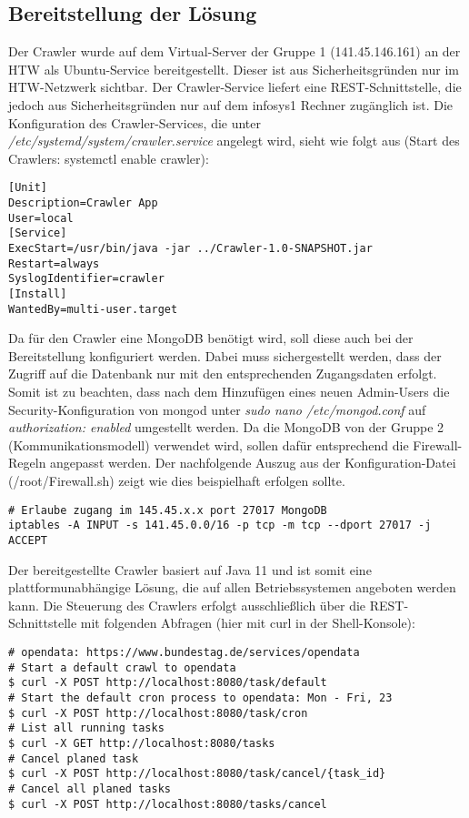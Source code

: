 \subsection{Bereitstellung der Lösung}
Der Crawler wurde auf dem Virtual-Server der Gruppe 1 (141.45.146.161) an der HTW als Ubuntu-Service bereitgestellt. Dieser ist aus Sicherheitsgründen nur im HTW-Netzwerk sichtbar. Der Crawler-Service liefert eine REST-Schnittstelle, die jedoch aus Sicherheitsgründen nur auf dem infosys1 Rechner zugänglich ist. Die Konfiguration des Crawler-Services, die unter \textit{/etc/systemd/system/crawler.service} angelegt wird, sieht wie folgt aus (Start des Crawlers: systemctl enable crawler):
\begin{lstlisting}
[Unit]
Description=Crawler App
User=local
[Service]
ExecStart=/usr/bin/java -jar ../Crawler-1.0-SNAPSHOT.jar
Restart=always
SyslogIdentifier=crawler
[Install]
WantedBy=multi-user.target
\end{lstlisting}
Da für den Crawler eine MongoDB benötigt wird, soll diese auch bei der Bereitstellung konfiguriert werden. Dabei muss sichergestellt werden, dass der Zugriff auf die Datenbank nur mit den entsprechenden Zugangsdaten erfolgt. Somit ist zu beachten, dass nach dem Hinzufügen eines neuen Admin-Users die Security-Konfiguration von mongod unter \textit{sudo nano /etc/mongod.conf} auf \textit{authorization: enabled} umgestellt werden. Da die MongoDB von der Gruppe 2 (Kommunikationsmodell) verwendet wird, sollen dafür entsprechend die Firewall-Regeln angepasst werden. Der nachfolgende Auszug aus der Konfiguration-Datei (/root/Firewall.sh) zeigt wie dies beispielhaft erfolgen sollte.
\begin{lstlisting}
# Erlaube zugang im 145.45.x.x port 27017 MongoDB
iptables -A INPUT -s 141.45.0.0/16 -p tcp -m tcp --dport 27017 -j ACCEPT
\end{lstlisting}
Der bereitgestellte Crawler basiert auf Java 11 und ist somit eine plattformunabhängige Lösung, die auf allen Betriebssystemen angeboten werden kann. Die Steuerung des Crawlers erfolgt ausschließlich über die REST-Schnittstelle mit folgenden Abfragen (hier mit curl in der Shell-Konsole):
\begin{lstlisting}
# opendata: https://www.bundestag.de/services/opendata
# Start a default crawl to opendata
$ curl -X POST http://localhost:8080/task/default
# Start the default cron process to opendata: Mon - Fri, 23
$ curl -X POST http://localhost:8080/task/cron
# List all running tasks
$ curl -X GET http://localhost:8080/tasks 
# Cancel planed task
$ curl -X POST http://localhost:8080/task/cancel/{task_id}
# Cancel all planed tasks
$ curl -X POST http://localhost:8080/tasks/cancel
\end{lstlisting}

